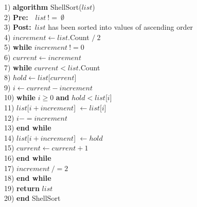 \begin{tabbing}
1)  \textbf{alg}\= \textbf{orithm} ShellSort($list$) \\
2)  \> \textbf{Pre:}~~$list~!=~\emptyset$ \\
3)  \> \textbf{Post:}~$list$ has been sorted into values of ascending order \\
4)  \> $increment \leftarrow list$.Count $/~2$ \\
5)  \> \textbf{whi}\= \textbf{le} $increment~!= 0$ \\
6)  \> \> $current \leftarrow increment$ \\
7)  \> \> \textbf{whi}\= \textbf{le} $current < list$.Count \\
8)  \> \> \> $hold \leftarrow list$[$current$] \\
9)  \> \> \> $i \leftarrow current - increment$ \\
10) \> \> \> \textbf{whi}\= \textbf{le} $i \geq 0$ \textbf{and} $hold < list$[$i$] \\
11) \> \> \> \> $list$[$i + increment$] $\leftarrow list$[$i$] \\
12) \> \> \> \> $i -= increment$ \\
13) \> \> \> \textbf{end while} \\
14) \> \> \> $list$[$i + increment$] $\leftarrow hold$ \\
15) \> \> \> $current \leftarrow current + 1$ \\
16) \> \> \textbf{end while} \\
17) \> \> $increment~/= 2$ \\
18) \> \textbf{end while} \\
19) \> \textbf{return} $list$ \\
20) \textbf{end} ShellSort \\
\end{tabbing}

